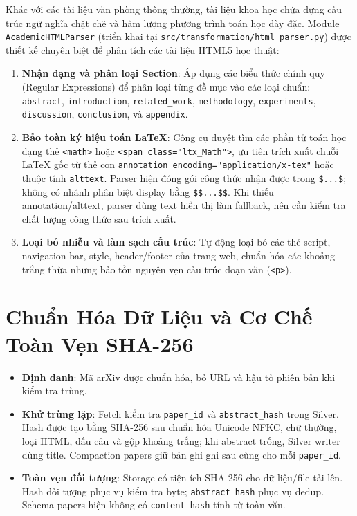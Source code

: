 Khác với các tài liệu văn phòng thông thường, tài liệu khoa học chứa đựng cấu trúc ngữ nghĩa chặt chẽ và hàm lượng phương trình toán học dày đặc. Module \texttt{AcademicHTMLParser} (triển khai tại \texttt{src/transformation/html\_parser.py}) được thiết kế chuyên biệt để phân tích các tài liệu HTML5 học thuật:

\begin{enumerate}[label=\alph*)]
  \item \textbf{Nhận dạng và phân loại Section}: Áp dụng các biểu thức chính quy (Regular Expressions) để phân loại từng đề mục vào các loại chuẩn: \texttt{abstract}, \texttt{introduction}, \texttt{related\_work}, \texttt{methodology}, \texttt{experiments}, \texttt{discussion}, \texttt{conclusion}, và \texttt{appendix}.
  \item \textbf{Bảo toàn ký hiệu toán LaTeX}: Công cụ duyệt tìm các phần tử toán học dạng thẻ \texttt{<math>} hoặc \texttt{<span class="ltx\_Math">}, ưu tiên trích xuất chuỗi LaTeX gốc từ thẻ con \texttt{annotation encoding="application/x-tex"} hoặc thuộc tính \texttt{alttext}. Parser hiện đóng gói công thức nhận được trong \lstinline{$...$}; không có nhánh phân biệt display bằng \lstinline{$$...$$}. Khi thiếu annotation/alttext, parser dùng text hiển thị làm fallback, nên cần kiểm tra chất lượng công thức sau trích xuất.
  \item \textbf{Loại bỏ nhiễu và làm sạch cấu trúc}: Tự động loại bỏ các thẻ script, navigation bar, style, header/footer của trang web, chuẩn hóa các khoảng trắng thừa nhưng bảo tồn nguyên vẹn cấu trúc đoạn văn (\texttt{<p>}).
\end{enumerate}

\section{Chuẩn Hóa Dữ Liệu và Cơ Chế Toàn Vẹn SHA-256}
\begin{itemize}
\item \textbf{Định danh}: Mã arXiv được chuẩn hóa, bỏ URL và hậu tố phiên bản khi kiểm tra trùng.
\item \textbf{Khử trùng lặp}: Fetch kiểm tra \texttt{paper\_id} và \texttt{abstract\_hash} trong Silver. Hash được tạo bằng SHA-256 sau chuẩn hóa Unicode NFKC, chữ thường, loại HTML, dấu câu và gộp khoảng trắng; khi abstract trống, Silver writer dùng title. Compaction papers giữ bản ghi ghi sau cùng cho mỗi \texttt{paper\_id}.
\item \textbf{Toàn vẹn đối tượng}: Storage có tiện ích SHA-256 cho dữ liệu/file tải lên. Hash đối tượng phục vụ kiểm tra byte; \texttt{abstract\_hash} phục vụ dedup. Schema papers hiện không có \texttt{content\_hash} tính từ toàn văn.
\end{itemize}

